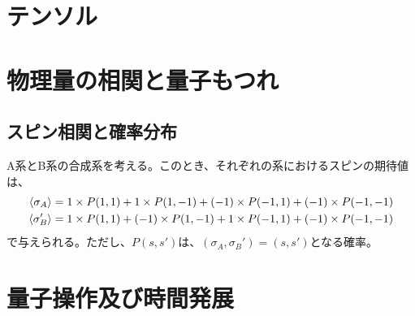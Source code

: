 \documentclass[a4paper,11pt]{jsarticle}
\begin{document}
\section{テンソル}

\section{物理量の相関と量子もつれ}
\subsection{スピン相関と確率分布}
A系とB系の合成系を考える。このとき、それぞれの系におけるスピンの期待値は、
\begin{align}
    \ev{\sigma_A} =1\times P(1,1)+1\times P(1,-1)+(-1)\times P(-1,1)+(-1)\times P(-1,-1)\\
    \ev{\sigma_B '} =1\times P(1,1)+(-1)\times P(1,-1)+1\times P(-1,1)+(-1)\times P(-1,-1)\\
\end{align}
で与えられる。ただし、$P(s,s')$は、$(\sigma_A,\sigma_B ')=(s,s')$となる確率。\\

\section{量子操作及び時間発展}
\end{document}

